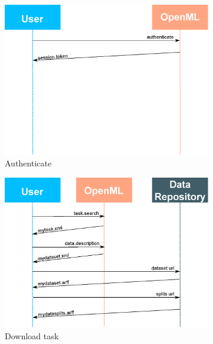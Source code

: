 \documentclass[10pt, twoside]{article}
\begin{document}
\begin{figure}[ht!]
	\centering
	\begin{subfigure}{.48\textwidth}
		\centering
		\includegraphics[width=\textwidth]{eps/api_authenticate.eps}
		\caption{Authenticate}
		\label{fig:api_authenticate}
	\end{subfigure}
	\hspace{2 mm}
	\begin{subfigure}{.48\textwidth}
		\centering
		\includegraphics[width=\textwidth]{eps/api_task.eps}
		\caption{Download task}
		\label{fig:api_task}
	\end{subfigure}
	\begin{subfigure}{.48\textwidth}
		\centering

\end{subfigure}
\end{figure}
\end{document}
